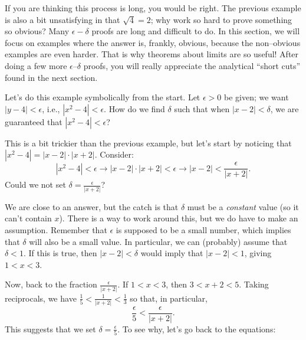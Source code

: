 If you are thinking this process is long, you would be right.  The previous example is also a bit unsatisfying in that $\sqrt{4}=2$; why work so hard to prove something so obvious? Many $\epsilon-\delta$ proofs are long and difficult to do. In this section, we will focus on examples where the answer is, frankly, obvious, because the non--obvious examples are even harder.  That is why theorems about limits are so useful! After doing a few more $\epsilon$--$\delta$ proofs, you will really appreciate the analytical ``short cuts'' found in the next section.\\

{Let's do this example symbolically from the start.  Let $\epsilon > 0$ be given; we want $|y-4| < \epsilon$, i.e.,  $|x^2-4| < \epsilon$.  How do we find $\delta$ such that when $|x-2| < \delta$, we are guaranteed that $|x^2-4|<\epsilon$?%

This is a bit trickier than the previous example, but let's start by noticing that 
$|x^2-4| = |x-2|\cdot|x+2|$.  Consider:\\
\begin{equation} |x^2-4| < \epsilon \longrightarrow |x-2|\cdot|x+2| < \epsilon \longrightarrow |x-2| < \frac{\epsilon}{|x+2|}.\label{eq:limit1}\end{equation} 
Could we not set $\displaystyle \delta = \frac{\epsilon}{|x+2|}$?  

We are close to an answer, but the catch is that $\delta$ must be a \textit{constant} value (so it can't contain $x$).  There is a way to work around this, but we do have to make an assumption.  Remember that $\epsilon$ is supposed to be a small number, which implies that $\delta$ will also be a small value.  In particular, we can (probably) assume that $\delta < 1$.  If this is true, then $|x-2| < \delta$ would imply that $|x-2| < 1$, giving $1 < x < 3$.  

Now, back to the fraction $\displaystyle \frac{\epsilon}{|x+2|}$.  If $1<x<3$, then $3<x+2<5$.  Taking reciprocals, we have $\displaystyle \frac{1}{5}<\frac{1}{|x+2|}<\frac{1}{3}$ so that, in particular, 
\begin{equation} \frac{\epsilon}{5}<\frac{\epsilon}{|x+2|}.\label{eq:limit2}\end{equation}  
This suggests that we set 
$\displaystyle \delta = \frac{\epsilon}{5}$. To see why, let's go back to the equations:

}
